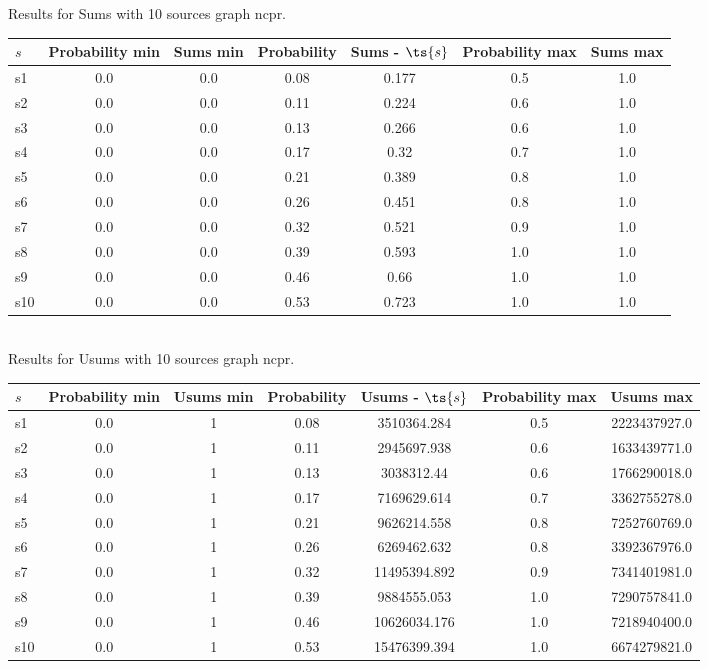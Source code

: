 \documentclass{article}
\begin{document}
\noindent Results for Sums with 10 sources graph ncpr.

\noindent\begin{tabular}{|l|c|c|c|c|c|c|}
\hline
$s$& Probability min & Sums min & Probability & Sums - $\ts{s}$ & Probability max & Sums max\\
\hline
s1 &0.0 & 0.0 & 0.08 & 0.177 & 0.5 & 1.0\\
\hline
s2 &0.0 & 0.0 & 0.11 & 0.224 & 0.6 & 1.0\\
\hline
s3 &0.0 & 0.0 & 0.13 & 0.266 & 0.6 & 1.0\\
\hline
s4 &0.0 & 0.0 & 0.17 & 0.32 & 0.7 & 1.0\\
\hline
s5 &0.0 & 0.0 & 0.21 & 0.389 & 0.8 & 1.0\\
\hline
s6 &0.0 & 0.0 & 0.26 & 0.451 & 0.8 & 1.0\\
\hline
s7 &0.0 & 0.0 & 0.32 & 0.521 & 0.9 & 1.0\\
\hline
s8 &0.0 & 0.0 & 0.39 & 0.593 & 1.0 & 1.0\\
\hline
s9 &0.0 & 0.0 & 0.46 & 0.66 & 1.0 & 1.0\\
\hline
s10 &0.0 & 0.0 & 0.53 & 0.723 & 1.0 & 1.0\\
\hline
\end{tabular}\\

\noindent Results for Usums with 10 sources graph ncpr.

\noindent\begin{tabular}{|l|c|c|c|c|c|c|}
\hline
$s$& Probability min & Usums min & Probability & Usums - $\ts{s}$ & Probability max & Usums max\\
\hline
s1 &0.0 & 1 & 0.08 & 3510364.284 & 0.5 & 2223437927.0\\
\hline
s2 &0.0 & 1 & 0.11 & 2945697.938 & 0.6 & 1633439771.0\\
\hline
s3 &0.0 & 1 & 0.13 & 3038312.44 & 0.6 & 1766290018.0\\
\hline
s4 &0.0 & 1 & 0.17 & 7169629.614 & 0.7 & 3362755278.0\\
\hline
s5 &0.0 & 1 & 0.21 & 9626214.558 & 0.8 & 7252760769.0\\
\hline
s6 &0.0 & 1 & 0.26 & 6269462.632 & 0.8 & 3392367976.0\\
\hline
s7 &0.0 & 1 & 0.32 & 11495394.892 & 0.9 & 7341401981.0\\
\hline
s8 &0.0 & 1 & 0.39 & 9884555.053 & 1.0 & 7290757841.0\\
\hline
s9 &0.0 & 1 & 0.46 & 10626034.176 & 1.0 & 7218940400.0\\
\hline
s10 &0.0 & 1 & 0.53 & 15476399.394 & 1.0 & 6674279821.0\\
\hline
\end{tabular}\\
\end{document}
